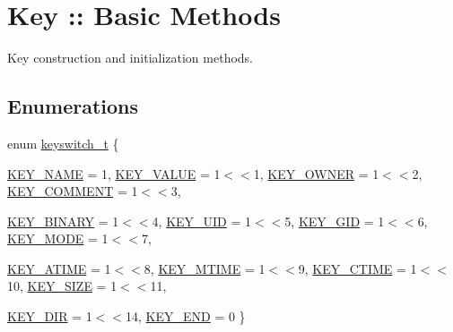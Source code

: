 \hypertarget{group__key}{
\section{Key :: Basic Methods}
\label{group__key}
}


Key construction and initialization methods.  


\subsection*{Enumerations}
\begin{DoxyCompactItemize}
\item 
enum \hyperlink{group__key_ga91fb3178848bd682000958089abbaf40}{keyswitch\_\-t} \{ \par
\hyperlink{group__key_gga91fb3178848bd682000958089abbaf40ad6127fc38f96410bf7c8f6e93b0397da}{KEY\_\-NAME} = 1, 
\hyperlink{group__key_gga91fb3178848bd682000958089abbaf40ac66e4a49d09212b79f5754ca6db5bd2e}{KEY\_\-VALUE} = 1$<$$<$1, 
\hyperlink{group__key_gga91fb3178848bd682000958089abbaf40a77ca60362fa8daca8d5347db4385068b}{KEY\_\-OWNER} = 1$<$$<$2, 
\hyperlink{group__key_gga91fb3178848bd682000958089abbaf40ac29427bb47cc31689d02912e36161ee3}{KEY\_\-COMMENT} = 1$<$$<$3, 
\par
\hyperlink{group__key_gga91fb3178848bd682000958089abbaf40a1ca18d4e094ae7487d35ecedda2235ff}{KEY\_\-BINARY} = 1$<$$<$4, 
\hyperlink{group__key_gga91fb3178848bd682000958089abbaf40a28f01a87d65f065172f734c9c9446c0e}{KEY\_\-UID} = 1$<$$<$5, 
\hyperlink{group__key_gga91fb3178848bd682000958089abbaf40ac0628bbaba7c837ca73323681393d15f}{KEY\_\-GID} = 1$<$$<$6, 
\hyperlink{group__key_gga91fb3178848bd682000958089abbaf40a1b0a91ff3a855d6993930ebf0abaa518}{KEY\_\-MODE} = 1$<$$<$7, 
\par
\hyperlink{group__key_gga91fb3178848bd682000958089abbaf40af303f9ebb4983d7500ba8e06ef3ec178}{KEY\_\-ATIME} = 1$<$$<$8, 
\hyperlink{group__key_gga91fb3178848bd682000958089abbaf40abfbab4bf55be6c53a7ffb2e43a82b355}{KEY\_\-MTIME} = 1$<$$<$9, 
\hyperlink{group__key_gga91fb3178848bd682000958089abbaf40afbad53ecfc1512b1b49ca04b57a628b4}{KEY\_\-CTIME} = 1$<$$<$10, 
\hyperlink{group__key_gga91fb3178848bd682000958089abbaf40a6d531b5c41445d19d0452eebdccbfa01}{KEY\_\-SIZE} = 1$<$$<$11, 
\par
\hyperlink{group__key_gga91fb3178848bd682000958089abbaf40a9e43e47c8a21478538e2d20e049981d5}{KEY\_\-DIR} = 1$<$$<$14, 
\hyperlink{group__key_gga91fb3178848bd682000958089abbaf40aa8adb6fcb92dec58fb19410eacfdd403}{KEY\_\-END} = 0
 \}
\end{DoxyCompactItemize}
